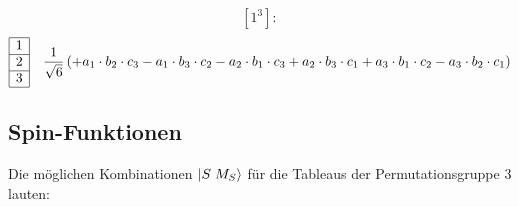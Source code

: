 \documentclass[fleqn]{article}%
\newcommand{\checkpagebreak}{\needspace{.25\textheight}}%
\begin{document}
\vspace{0.25cm}%
\vspace{0.25cm}%
\vspace{0.25cm}%
\begin{dmath*}\left[1^3\right]:\end{dmath*}%
\vspace{0.25cm}%
\begin{dmath*}\begin{array}{|c|} \hline 1\\ \cline{1-1} 2\\ \cline{1-1} 3\\ \cline{1-1} \end{array} \quad \frac{1}{\sqrt{6}} \left( + a_{1} \cdot b_{2} \cdot c_{3}  - a_{1} \cdot b_{3} \cdot c_{2}  - a_{2} \cdot b_{1} \cdot c_{3}  + a_{2} \cdot b_{3} \cdot c_{1}  + a_{3} \cdot b_{1} \cdot c_{2}  - a_{3} \cdot b_{2} \cdot c_{1}\right) \end{dmath*}%
\vspace{0.25cm}%
\vspace{0.25cm}%
\checkpagebreak%
\subsection{Spin{-}Funktionen}%
\label{subsec:Spin{-}Funktionen}%
Die möglichen Kombinationen $\ket{S \; M_S}$ für die Tableaus der Permutationsgruppe 3 lauten:
\end{document}
